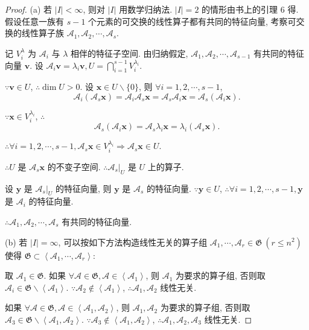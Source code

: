 \documentclass[color=black,device=normal,lang=cn,mode=geye]{elegantnote}
\begin{document}
\begin{proof}
    (a) 若 $|I|<\infty$, 则对 $|I|$ 用数学归纳法. $|I|=2$ 的情形由书上的引理 6 得. 假设任意一族有 $s-1$ 个元素的可交换的线性算子都有共同的特征向量, 考察可交换的线性算子族 $\mathcal{A}_1,\mathcal{A}_2,\cdots,\mathcal{A}_s$.

    记 $V^\lambda_i$ 为 $\mathcal{A}_i$ 与 $\lambda$ 相伴的特征子空间. 由归纳假定, $\mathcal{A}_1,\mathcal{A}_2,\cdots,\mathcal{A}_{s-1}$ 有共同的特征向量 $\boldsymbol{v}$. 设 $\mathcal{A}_i\boldsymbol{v}=\lambda_i\boldsymbol{v},U=\bigcap\limits_{i=1}^{s-1}V^{\lambda_i}_i$.
    
    $\because\boldsymbol{v}\in U$, $\therefore\dim U>0$. 设 $\boldsymbol{x}\in U\backslash\{0\}$, 则 $\forall i=1,2,\cdots,s-1$,
    \[\mathcal{A}_i(\mathcal{A}_s\boldsymbol{x})=\mathcal{A}_i\mathcal{A}_s\boldsymbol{x}=\mathcal{A}_s\mathcal{A}_i\boldsymbol{x}=\mathcal{A}_s(\mathcal{A}_i\boldsymbol{x}).\]
    
    $\because\boldsymbol{x}\in V^{\lambda_i}_i$, $\therefore$
    \[\mathcal{A}_s(\mathcal{A}_i\boldsymbol{x})=\mathcal{A}_s\lambda_i\boldsymbol{x}=\lambda_i(\mathcal{A}_s\boldsymbol{x}).\]

    $\therefore\forall i=1,2,\cdots,s-1,\mathcal{A}_s\boldsymbol{x}\in V^{\lambda_i}_i\Rightarrow\mathcal{A}_s\boldsymbol{x}\in U$.

    $\therefore U$ 是 $\mathcal{A}_s\boldsymbol{x}$ 的不变子空间. $\therefore\mathcal{A}_s|_U$ 是 $U$ 上的算子.

    设 $\boldsymbol{y}$ 是 $\mathcal{A}_s|_U$ 的特征向量, 则 $\boldsymbol{y}$ 是 $\mathcal{A}_s$ 的特征向量. $\because\boldsymbol{y}\in U$, $\therefore\forall i=1,2,\cdots,s-1,\boldsymbol{y}$ 是 $\mathcal{A}_i$ 的特征向量.

    $\therefore\mathcal{A}_1,\mathcal{A}_2,\cdots,\mathcal{A}_s$ 有共同的特征向量.

    (b) 若 $|I|=\infty$, 可以按如下方法构造线性无关的算子组 $\mathcal{A}_1,\cdots,\mathcal{A}_r\in\mathfrak{G}\ (r\leq n^2)$ 使得 $\mathfrak{G}\subset\left<\mathcal{A}_1,\cdots,\mathcal{A}_r\right>$:

    取 $\mathcal{A}_1\in\mathfrak{G}$. 如果 $\forall\mathcal{A}\in\mathfrak{G},\mathcal{A}\in\left<\mathcal{A}_1\right>$, 则 $\mathcal{A}_1$ 为要求的算子组, 否则取 $\mathcal{A}_i\in\mathfrak{G}\backslash\left<\mathcal{A}_1\right>$. $\because\mathcal{A}_2\notin\left<\mathcal{A}_1\right>$, $\therefore\mathcal{A}_1,\mathcal{A}_2$ 线性无关.
    
    如果 $\forall\mathcal{A}\in\mathfrak{G},\mathcal{A}\in\left<\mathcal{A}_1,\mathcal{A}_2\right>$, 则 $\mathcal{A}_1,\mathcal{A}_2$ 为要求的算子组, 否则取 $\mathcal{A}_3\in\mathfrak{G}\backslash\left<\mathcal{A}_1,\mathcal{A}_2\right>$. $\because\mathcal{A}_3\notin\left<\mathcal{A}_1,\mathcal{A}_2\right>$, $\therefore\mathcal{A}_1,\mathcal{A}_2,\mathcal{A}_3$ 线性无关.
    

\end{proof}
\end{document}
